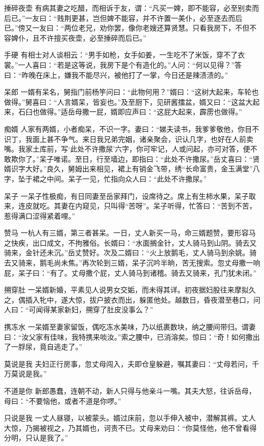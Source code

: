 \documentclass[12pt,UTF8]{ctexbook}
\begin{document}
捶碎夜壶
有病其妻之吃醋，而相诉于友，谓：“凡买一婢，即不能容，必至别卖而后已。”一友曰：“贱荆更甚，岂但婢不能容，并不许置一美仆，必至逐去而后已。”傍又一友曰：“两位老兄，劝你罢，像你老嫂还算贤慧。只看我房下，不但不容婢仆，且不许擅买夜壶，必至捶碎而后已。”

手硬
有相士对人谈相云：“男手如枪，女手如姜，一生吃不了米饭，穿不了衣裳。”一人喜曰：“若是这等说，我房下是个有造化的。”人问：“何以见得？”答曰：“昨晚在床上，嫌我不能尽兴，被他打了一掌，今日还是辣渍渍的。”

呆郎
一婿有呆名，舅指门前杨竽问曰：“此物何用？”婿曰：“这树大起来，车轮也做得。”舅喜曰：“人言婿呆，皆妄也。”及至厨下，见研酱擂盆，婿又曰：“这盆大起来，石臼也做得。”适岳母撒一屁，婿即应声曰：“这屁大起来，霹雳也做得。”

痴婿
人家有两婿，小者痴呆，不识一字。妻曰：“娣夫读书，我爹爹敬他，你目不识丁，我面上甚不争气。来日我兄弟完姻，诸亲聚会，识认几字，也好在人前卖嘴。我家土库前，写‘此处不许撒尿’六字，你可牢记，人或问起，亦可对答，便不敢欺你了。”呆子唯诺。至日，行至墙边，即指曰：“此处不许撒尿。”岳丈喜曰：“贤婿识字大好。”良久，舅姆出来相见，裙上有销金飞带，绣“长命富贵，金玉满堂”八字，坠于裙之中间。呆子一见，忙指向众人曰：“此处不许撒尿。”

呆子
一呆子性极痴，有日同妻至岳家拜门，设席待之。席上有生柿水果，呆子取来，连皮就吃。其妻在内窥见，只叫得“苦呀”。呆子听得，忙答曰：“苦到不苦，惹得满口涩得紧着哩。”

赞马
一杭人有三婿，第三者甚呆。一日，丈人新买一马，命三婿题赞，要形容马之快疾，出口成文，不拘雅俗。长婿曰：“水面搁金针，丈人骑马到山阴。骑去又骑来，金针还未沉。”岳丈赞好。次及二婿曰：“火上放鹅毛，丈人骑马到余姚。骑去又骑来，鹅毛尚未焦。”再次轮到三婿，呆子沉吟半晌，苦无搜索。忽丈母撒一响屁，呆子曰：“有了。丈母撒个屁，丈人骑马到诸稽。骑去又骑来，孔门犹未闭。”

搠穿肚
一呆婿新婚，平素见人说男女交姤，而未得其详。初夜据妇股往来摩拟久之，偶插入牝中，遂大惊，拔户披衣而出，躲匿他处。越数日，昏夜潜至巷口，问人曰：“可闻得某家新妇，搠穿了肚皮没事么？”

携冻水
一呆婿至妻家留饭，偶吃冻水美味，乃以纸裹数块，纳之腰间带归。谓妻曰：“汝父家有佳味，我特携来啖汝。”索之腰中，已消溶矣。惊曰：“奇！如何撒出了一脬尿，竟自逃走了。”

莫说是我
夫妇正行房事，忽丈母闯入，夫即仓皇躲避，嘱其妻曰：“丈母若问，千万莫说是我。”

不道是你
新郎愚蠢，连朝不动，新人只得与他亲斗一嘴。其夫大怒，往诉岳母，母曰：“不要恼他，或者不道是你啰。”

只说是我
一丈人昼寝，以被蒙头。婿过床前，忽以手伸入被中，潜解其裤。丈人大惊，乃揭被视之，乃其婿也，诃责不已。丈母来劝曰：“你莫怪他，他不曾看得分明，只认是我了。”
\end{document}
